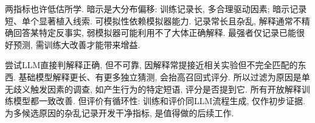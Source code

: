 两指标也许低估所学. 暗示是大分布偏移: 训练记录长, 多合理驱动因素; 暗示记录短、单个显著植入线索. 可模拟性依赖模拟器能力. 记录常长且杂乱, 解释通常不精确回答某特定反事实, 弱模拟器可能利用不了大体正确解释. 最强者仅记录已能很好预测, 需训练大改善才能带来增益.

尝试LLM直接判解释正确, 但不可靠, 因解释常提接近相关实验但不完全匹配的东西. 基础模型解释更长、有更多独立猜测, 会抬高召回式评分. 所以过滤为原因是单无歧义触发因素的调查, 如产生行为的特定短语, 评分是否提到它. 所有开放解释训练模型都一致改善. 但评价有循环性: 训练和评价同LLM流程生成, 仅作初步证据. 为多候选原因的杂乱记录开发干净指标, 是值得做的后续工作.
